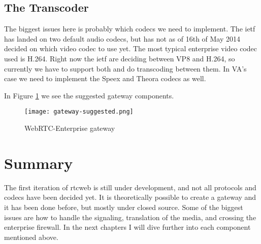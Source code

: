 \subsection{The Transcoder}
The biggest issues here is probably which codecs we need to implement. The \gls{ietf} has landed on two default audio codecs, but has not as of 16th of May 2014 decided on which video codec to use yet. The most typical enterprise video codec used is H.264. Right now the \gls{ietf} are deciding between VP8 and H.264, so currently we have to support both and do transcoding between them. In VA's case we need to implement the Speex and Theora codecs as well.

In Figure \ref{fig:gateway} we see the suggested gateway components.
\\
\begin{figure}[here]
\centerline{\texttt{[image: gateway-suggested.png]}}
\caption{WebRTC-Enterprise gateway}
\label{fig:gateway}
\end{figure}

\section{Summary}
The first iteration of \gls{rtcweb} is still under development, and not all protocols and codecs have been decided yet. It is theoretically possible to create a gateway and it has been done before, but mostly under closed source. Some of the biggest issues are how to handle the signaling, translation of the media, and crossing the enterprise firewall. In the next chapters I will dive further into each component mentioned above.
